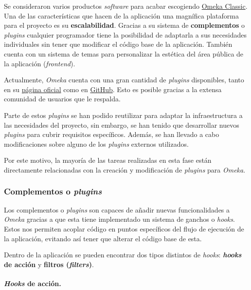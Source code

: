Se consideraron varios productos \emph{software} para acabar escogiendo
\href{https://omeka.org/classic/}{Omeka Classic}. Una de las
características que hacen de la aplicación una magnífica plataforma para
el proyecto es su \textbf{escalabilidad}. Gracias a su sistema de
\textbf{complementos} o \emph{plugins} cualquier programador tiene la
posibilidad de adaptarla a sus necesidades individuales sin tener que
modificar el código base de la aplicación. También cuenta con un sistema de
temas para personalizar la estética del área pública de la aplicación (\emph{frontend}).


Actualmente, \emph{Omeka} cuenta con una gran cantidad de \emph{plugins}
disponibles, tanto en su \href{https://omeka.org/classic/plugins/}{página
oficial} como en \href{https://daniel-km.github.io/UpgradeToOmekaS/omeka_plugins.html}{GitHub}.
Esto es posible gracias a la extensa comunidad de usuarios que le
respalda. 

Parte de estos \emph{plugins} se han podido reutilizar para
adaptar la infraestructura a las necesidades del proyecto, sin embargo,
se han tenido que desarrollar nuevos \emph{plugins} para cubrir
requisitos específicos. Además, se han llevado a cabo modificaciones
sobre alguno de los \emph{plugins} externos utilizados.

Por este motivo, la mayoría de las tareas realizadas en esta fase están directamente
relacionadas con la creación y modificación de \emph{plugins} para \emph{Omeka}.

\subsubsection{Complementos o \emph{plugins}}

Los complementos o \emph{plugins} son capaces de añadir nuevas
funcionalidades a \emph{Omeka} gracias a que esta tiene implementado un
sistema de ganchos o \emph{hooks}. Estos nos permiten acoplar código en
puntos específicos del flujo de ejecución de la aplicación, evitando así
tener que alterar el código base de esta.

Dentro de la aplicación se pueden encontrar dos tipos distintos de
\emph{hooks}: \textbf{\emph{hooks} de acción} y \textbf{filtros (\emph{filters})}.

\paragraph{\emph{Hooks} de acción.}

